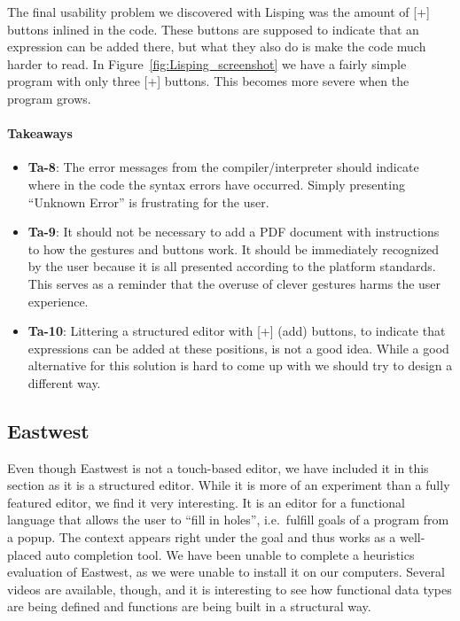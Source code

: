 The final usability problem we discovered with Lisping was the amount of [+] buttons inlined in the code. These buttons are supposed to indicate that an expression can be added there, but what they also do is make the code much harder to read.
In Figure~\ref{fig:Lisping_screenshot} we have a fairly simple program with
only three [+] buttons. This becomes more severe when the program grows.

\paragraph{Takeaways}
\begin{itemize}
	\item \textbf{Ta-8}: The error messages from the compiler/interpreter should indicate where in the code the syntax errors have occurred. Simply presenting ``Unknown Error'' is frustrating for the user.
	\item \textbf{Ta-9}: It should not be necessary to add a PDF document with instructions to how the gestures and buttons work. It should be immediately recognized by the user because it is all presented according to the platform standards. This serves as a reminder that the overuse of clever gestures harms the user experience.
	\item \textbf{Ta-10}: Littering a structured editor with [+] (add) buttons, to indicate that expressions can be added at these positions, is not a good idea. While a good alternative for this solution is hard to come up with we should try to design a different way.
\end{itemize}

\subsection{Eastwest}
\label{subsub:Eastwest}
Even though Eastwest is not a touch-based editor, we have included it in this section as it is a structured editor. 
While it is more of an experiment than a fully featured editor, we find it very interesting. It is an editor for a functional language that allows the user to ``fill in holes'', i.e.\ fulfill goals of a program from a popup. The context appears right under the goal and thus works as a well-placed auto completion tool. We have been unable to complete a heuristics evaluation of Eastwest, as we were unable to install it on our computers. Several videos are available, though, and it is interesting to see how functional data types are being defined and functions are being built in a structural way.

